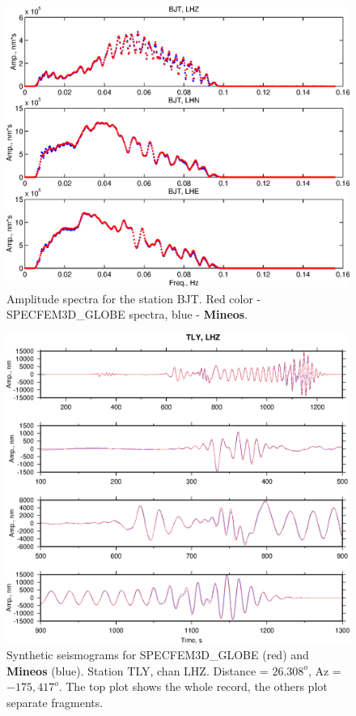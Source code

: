 \begin{figure}
\begin{center}
\includegraphics[width=7 in]{Figures/FspBJT}
\caption{Amplitude spectra for the station BJT. Red color - SPECFEM3D\_GLOBE spectra, blue - {\bf Mineos}.}
\label{fig:8a}
\end{center}
\end{figure}


\begin{figure}
\begin{center}
\includegraphics[width=7 in]{Figures/FigsTLYLHZ}
\caption{Synthetic seismograms for SPECFEM3D\_GLOBE (red) and {\bf Mineos} (blue). Station TLY, chan LHZ. 
Distance = $26.308^o$, Az = $-175,417^o$.
The top plot shows the whole record, the others plot separate fragments. }
\label{fig:9a}
\end{center}
\end{figure}

